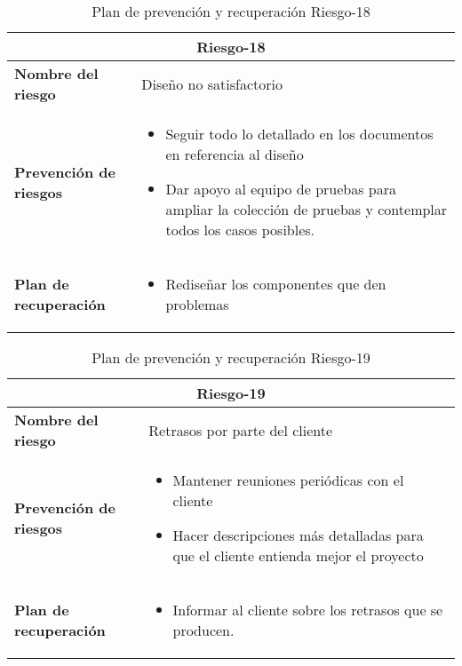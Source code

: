 \begin{table}[H]
\begin{center}
\begin{tabular}{p{} p{10cm}}
\multicolumn{2}{c}{\textbf{Riesgo-18} } \\
\hline \hline
\textbf{Nombre del riesgo} & Diseño no satisfactorio \\
\hline
\textbf{Prevención de riesgos} & \begin{itemize}[-]
  \item Seguir todo lo detallado en los documentos en referencia al diseño
  \item Dar apoyo al equipo de pruebas para ampliar la colección de pruebas y contemplar todos los casos posibles.
  \end{itemize} \\
\hline
\textbf{Plan de recuperación} &   \begin{itemize}[-]
  \item Rediseñar los componentes que den problemas
  \end{itemize}\\
\hline
\end{tabular}
\caption{Plan de prevención y recuperación Riesgo-18}
\label{tab:Riesgo-18-Prev_Recup}
\end{center}
\end{table}

\begin{table}[H]
\begin{center}
\begin{tabular}{p{} p{10cm}}
\multicolumn{2}{c}{\textbf{Riesgo-19} } \\
\hline \hline
\textbf{Nombre del riesgo} & Retrasos por parte del cliente \\
\hline
\textbf{Prevención de riesgos} & \begin{itemize}[-]
  \item Mantener reuniones periódicas con el cliente
  \item Hacer descripciones más detalladas para que el cliente entienda mejor el proyecto
  \end{itemize} \\
\hline
\textbf{Plan de recuperación} &   \begin{itemize}[-]
  \item Informar al cliente sobre los retrasos que se producen.
  \end{itemize}\\
\hline
\end{tabular}
\caption{Plan de prevención y recuperación Riesgo-19}
\label{tab:Riesgo-19-Prev_Recup}
\end{center}
\end{table}

